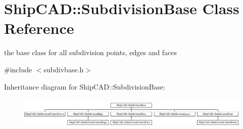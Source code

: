 \hypertarget{classShipCAD_1_1SubdivisionBase}{\section{Ship\-C\-A\-D\-:\-:Subdivision\-Base Class Reference}
\label{classShipCAD_1_1SubdivisionBase}
}


the base class for all subdivision points, edges and faces  




{\ttfamily \#include $<$subdivbase.\-h$>$}

Inheritance diagram for Ship\-C\-A\-D\-:\-:Subdivision\-Base\-:\begin{figure}[H]
\begin{center}
\leavevmode
\includegraphics[height=1.534247cm]{classShipCAD_1_1SubdivisionBase}
\end{center}
\end{figure}
